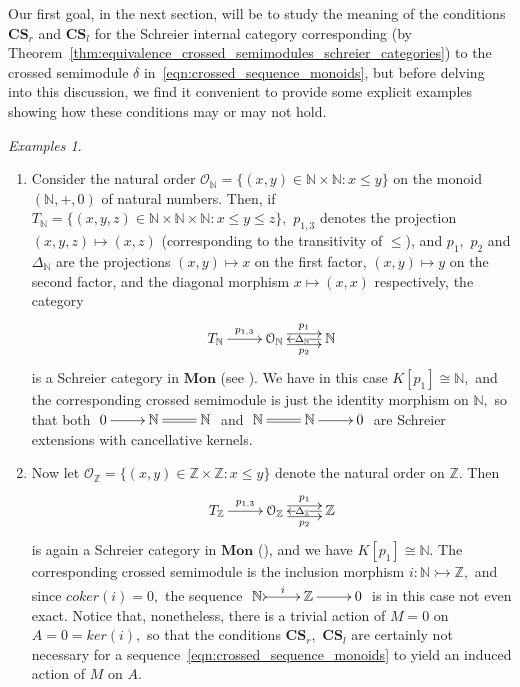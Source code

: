 \documentclass[a4paper]{amsart}
\theoremstyle{plain}
\theoremstyle{definition}
\theoremstyle{remark}
\newtheorem{examples}[subsection]{Examples}
\begin{document}
Our first goal, in the next section, will be to study the meaning of the conditions $\mathbf{CS}_r$ and $\mathbf{CS}_l$ for the Schreier internal category corresponding (by Theorem~\ref{thm:equivalence_crossed_semimodules_schreier_categories}) to the crossed semimodule $\delta$ in~\eqref{eqn:crossed_sequence_monoids}, but before delving into this discussion, we find it convenient to provide some explicit examples showing how these conditions may or may not hold.
\begin{examples}
\begin{enumerate}
\item Consider the natural order $\mathcal{O}_{\mathbb{N}}=\{(x,y)\in\mathbb{N}\times\mathbb{N}:x\leq y\}$ on the monoid $(\mathbb{N},+,0)$ of natural numbers. Then, if $T_{\mathbb{N}}=\{(x,y,z)\in\mathbb{N}\times\mathbb{N}\times\mathbb{N}:x\leq y\leq z\},$ $p_{1,3}$ denotes the projection $(x,y,z)\mapsto (x,z)$ (corresponding to the transitivity of $\leq$), and $p_1,$ $p_2$ and $\Delta_{\mathbb{N}}$ are the projections $(x,y)\mapsto x$ on the first factor, $(x,y)\mapsto y$ on the second factor, and the diagonal morphism $x\mapsto (x,x)$ respectively, the category
\begin{equation*}
\xymatrix{{T_{\mathbb{N}}} \ar[r]^-{p_{1,3}} &{\mathcal{O}_{\mathbb{N}}} \ar@<.9ex>[r]^-{p_1} \ar@<-.9ex>[r]_-{p_2} &{\mathbb{N}} \ar[l]|{\Delta_{\mathbb{N}}} }
\end{equation*}
is a Schreier category in $\mathbf{Mon}$ (see \cite[Example 3.1.2]{schreier_book}). We have in this case $K[p_1]\cong \mathbb{N},$ and the corresponding crossed semimodule is just the identity morphism on $\mathbb{N},$ so that both $\xymatrix{0 \ar[r] &{\mathbb{N}} \ar@{=}[r] &{\mathbb{N}}}$ and $\xymatrix{{\mathbb{N}} \ar@{=}[r] &{\mathbb{N}} \ar[r] &0}$ are Schreier extensions with cancellative kernels.
\item Now let $\mathcal{O}_{\mathbb{Z}}=\{(x,y)\in\mathbb{Z}\times\mathbb{Z}:x\leq y\}$ denote the natural order on $\mathbb{Z}.$ Then
\begin{equation*}
\xymatrix{{T_{\mathbb{Z}}} \ar[r]^-{p_{1,3}} &{\mathcal{O}_{\mathbb{Z}}} \ar@<.9ex>[r]^-{p_1} \ar@<-.9ex>[r]_-{p_2} &{\mathbb{Z}} \ar[l]|{\Delta_{\mathbb{Z}}} }
\end{equation*}
is again a Schreier category in $\mathbf{Mon}$ (\cite[Example 3.1.3]{schreier_book}), and we have $K[p_1]\cong\mathbb{N}.$ The corresponding crossed semimodule is the inclusion morphism $i\colon\mathbb{N}\rightarrowtail\mathbb{Z},$ and since $coker(i)=0,$ the sequence $\xymatrix{ {\mathbb{N}} \ar@{>->}[r]^-i &{\mathbb{Z}} \ar[r] &0}$ is in this case not even exact. Notice that, nonetheless, there is a trivial action of $M=0$ on $A=0=ker(i),$ so that the conditions $\mathbf{CS}_r,$ $\mathbf{CS}_l$ are certainly not necessary for a sequence~\eqref{eqn:crossed_sequence_monoids} to yield an induced action of $M$ on $A.$

\end{enumerate}
\end{examples}
\end{document}
